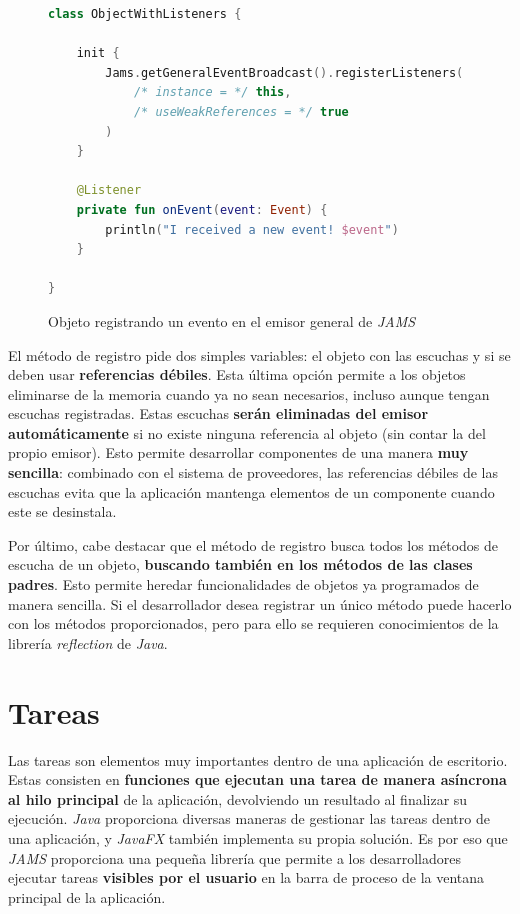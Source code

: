 \begin{figure}[h]
    \centering
    \begin{lstlisting}[frame=single,label={lst:event-registration-use},language=Kotlin]
class ObjectWithListeners {

    init {
        Jams.getGeneralEventBroadcast().registerListeners(
            /* instance = */ this,
            /* useWeakReferences = */ true
        )
    }

    @Listener
    private fun onEvent(event: Event) {
        println("I received a new event! $event")
    }

}
    \end{lstlisting}
    \caption{Objeto registrando un evento en el emisor general de \textit{JAMS}}
    \label{fig:event-registration}
\end{figure}

\noindent El método de registro pide dos simples variables: el objeto
con las escuchas y si se deben usar \textbf{referencias débiles}.
Esta última opción permite a los objetos eliminarse de la memoria
cuando ya no sean necesarios, incluso aunque tengan escuchas registradas.
Estas escuchas \textbf{serán eliminadas del emisor automáticamente} si no existe
ninguna referencia al objeto (sin contar la del propio emisor).
Esto permite desarrollar componentes de una manera \textbf{muy sencilla}:
combinado con el sistema de proveedores, las referencias débiles
de las escuchas evita que la aplicación mantenga elementos de un
componente cuando este se desinstala.

\noindent Por último, cabe destacar que el método de registro
busca todos los métodos de escucha de un objeto,
\textbf{buscando también en los métodos de las clases padres}.
Esto permite heredar funcionalidades de objetos ya programados
de manera sencilla.
Si el desarrollador desea registrar un único método puede hacerlo
con los métodos proporcionados, pero para ello se requieren
conocimientos de la librería \textit{reflection} de \textit{Java}.


\section{Tareas}\label{sec:tareas}

Las tareas son elementos muy importantes dentro de una aplicación
de escritorio.
Estas consisten en \textbf{funciones que ejecutan una tarea de manera
asíncrona al hilo principal} de la aplicación, devolviendo un
resultado al finalizar su ejecución.
\textit{Java} proporciona diversas maneras de gestionar
las tareas dentro de una aplicación, y \textit{JavaFX}
también implementa su propia solución.
Es por eso que \textit{JAMS} proporciona una pequeña
librería que permite a los desarrolladores ejecutar
tareas \textbf{visibles por el usuario} en la barra
de proceso de la ventana principal de la aplicación.


